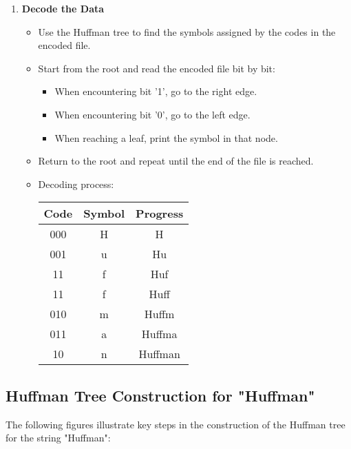 \begin{enumerate}[label=\textbf{\Alph*.}]
    \item \textbf{Decode the Data}  
    \begin{itemize}  
        \item Use the Huffman tree to find the symbols assigned by the codes in the encoded file.  
        \item Start from the root and read the encoded file bit by bit:  
        \begin{itemize}  
            \item When encountering bit '1', go to the right edge.  
            \item When encountering bit '0', go to the left edge.  
            \item When reaching a leaf, print the symbol in that node.  
        \end{itemize}  
        \item Return to the root and repeat until the end of the file is reached.  
        \item Decoding process:  
        \begin{center}  
        \begin{tabular}{|c|c|c|}  
        \hline 
        \rowcolor{gray!30}
        Code & Symbol & Progress \\
        \hline  
        000 & H & H \\
        001 & u & Hu \\
        11 & f & Huf \\
        11 & f & Huff \\
        010 & m & Huffm \\
        011 & a & Huffma \\
        10 & n & Huffman \\
        \hline  
        \end{tabular}  
        \end{center}  
    \end{itemize}  
\end{enumerate}  

\subsection{Huffman Tree Construction for "Huffman"}  
The following figures illustrate key steps in the construction of the Huffman tree for the string "Huffman":  

